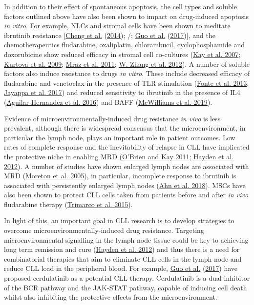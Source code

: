 \documentclass[11pt, a4paper, twosided]{book}
\begin{document}
In addition to their effect of spontaneous apoptosis, the cell types and soluble factors outlined above have also been shown to impact on drug-induced apoptosis \emph{in vitro}. For example, NLCs and stromal cells have been shown to meditate ibrutinib resistance {[}\protect\hyperlink{ref-Cheng2014}{Cheng et al.} (\protect\hyperlink{ref-Cheng2014}{2014}); /; \protect\hyperlink{ref-Guo2017}{Guo et al.} (\protect\hyperlink{ref-Guo2017}{2017}){]}, and the chemotherapeutics fludarabine, oxaliplatin, chlorambucil, cyclophosphamide and doxorubicine show reduced efficacy in stromal cell co-cultures (\protect\hyperlink{ref-Kay2007}{Kay et al. 2007}; \protect\hyperlink{ref-Kurtova2009}{Kurtova et al. 2009}; \protect\hyperlink{ref-Mraz2011}{Mraz et al. 2011}; \protect\hyperlink{ref-Zhang2012}{W. Zhang et al. 2012}). A number of soluble factors also induce resistance to drugs \emph{in vitro}. These include decreased efficacy of fludarabine and venetoclax in the presence of TLR stimulation (\protect\hyperlink{ref-Fonte2013}{Fonte et al. 2013}; \protect\hyperlink{ref-Jayappa2017}{Jayappa et al. 2017}) and reduced sensitivity to ibrutinib in the presence of IL4 (\protect\hyperlink{ref-AguilarHernandez2016}{Aguilar-Hernandez et al. 2016}) and BAFF (\protect\hyperlink{ref-McWilliams2019}{McWilliams et al. 2019}).

Evidence of microenvironmentally-induced drug resistance \emph{in vivo} is less prevalent, although there is widespread consensus that the microenvironment, in particular the lymph node, plays an important role in patient outcomes. Low rates of complete response and the inevitability of relapse in CLL have implicated the protective niche in enabling MRD (\protect\hyperlink{ref-OBrien2011}{O'Brien and Kay 2011}; \protect\hyperlink{ref-Hayden2012}{Hayden et al. 2012}). A number of studies have shown enlarged lymph nodes are associated with MRD (\protect\hyperlink{ref-Moreton2005}{Moreton et al. 2005}), in particular, incomplete response to ibrutinib is associated with persistently enlarged lymph nodes (\protect\hyperlink{ref-Ahn2018}{Ahn et al. 2018}). MSCs have also been shown to protect CLL cells taken from patients before and after \emph{in vivo} fludarabine therapy (\protect\hyperlink{ref-Trimarco2015}{Trimarco et al. 2015}).

In light of this, an important goal in CLL research is to develop strategies to overcome microenvironmentally-induced drug resistance. Targeting microenvironmental signalling in the lymph node tissue could be key to achieving long term remission and cure (\protect\hyperlink{ref-Hayden2012}{Hayden et al. 2012}) and thus there is a need for combinatorial therapies that aim to eliminate CLL cells in the lymph node and reduce CLL load in the peripheral blood. For example, \protect\hyperlink{ref-Guo2017}{Guo et al.} (\protect\hyperlink{ref-Guo2017}{2017}) have proposed cerdulatinib as a potential CLL therapy. Cerdulatinib is a dual inhibitor of the BCR pathway and the JAK-STAT pathway, capable of inducing cell death whilst also inhibiting the protective effects from the microenvironment.
\end{document}
